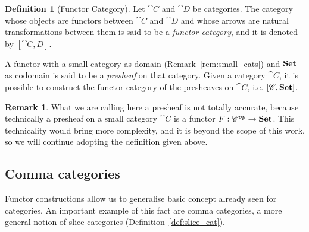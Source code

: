 \documentclass[a4paper, twoside,openright]{report}
\theoremstyle{plain}
\theoremstyle{definition}
\newtheorem{definition}[theorem]{Definition}
\newtheorem{remark}[theorem]{Remark}
\begin{document}
\begin{definition}[Functor Category]\label{def:functor_category}
    Let $\cat C$ and $\cat D$ be categories. The category whose objects are functors between $\cat C$ and $\cat D$ and whose arrows are natural transformations between them is said to be a \emph{functor category}, and it is denoted by $[\cat{C, D}]$.
\end{definition}

A functor with a small category as domain (Remark~\ref{rem:small_cats}) and $\mathbf{Set}$ as codomain is said to be a \emph{presheaf} on that category. Given a category $\cat C$, it is possible to construct the functor category of the presheaves on $\cat C$, i.e. $[\mathscr{C}, \mathbf{Set}]$.

\begin{remark}
    What we are calling here a presheaf is not totally accurate, because technically a presheaf on a small category $\cat C$ is a functor $F: \mathscr{C} ^{op} \rightarrow \mathbf{Set}$. This technicality would bring more complexity, and it is beyond the scope of this work, so we will continue adopting the definition given above.
\end{remark}

\subsection{Comma categories}

Functor constructions allow us to generalise basic concept already seen for categories. An important example of this fact are comma categories, a more general notion of slice categories (Definition~\ref{def:slice_cat}).

\end{document}
